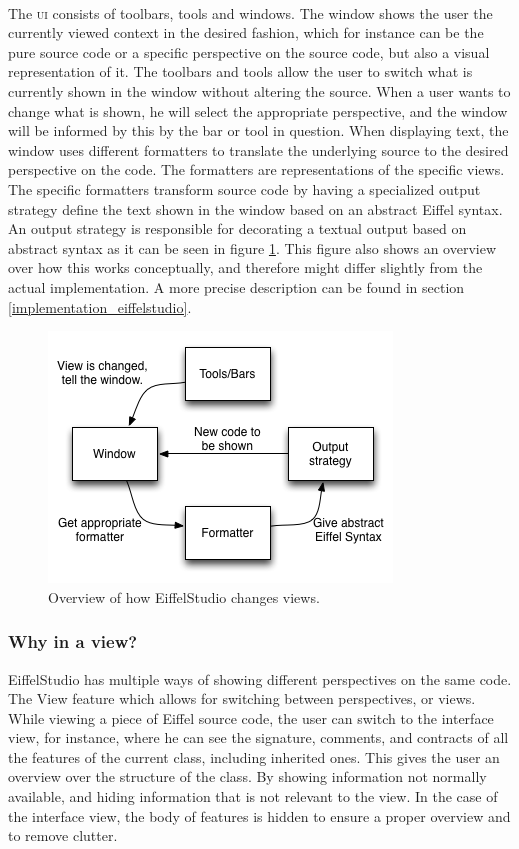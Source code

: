 \paragraph{}
The \textsc{ui} consists of toolbars, tools and windows. The window shows the user the currently viewed context in the desired fashion, which for instance can be the pure source code or a specific perspective on the source code, but also a visual representation of it. The toolbars and tools allow the user to switch what is currently shown in the window without altering the source. When a user wants to change what is shown, he will select the appropriate perspective, and the window will be informed by this by the bar or tool in question. When displaying text, the window uses different formatters to translate the underlying source to the desired perspective on the code. The formatters are representations of the specific views. The specific formatters transform source code by having a specialized output strategy define the text shown in the window based on an abstract Eiffel syntax. An output strategy is responsible for decorating a textual output based on abstract syntax as it can be seen in figure \ref{fig:eiffelstudio_view_change}. This figure also shows an overview over how this works conceptually, and therefore might differ slightly from the actual implementation. A more precise description can be found in section \ref{implementation_eiffelstudio}.

\begin{figure}[H]
\centerline{
\includegraphics[scale=0.7]{images/eiffel_view_text_design.png}
}
\caption[EiffelStudio view control]{Overview of how EiffelStudio changes views.}
\label{fig:eiffelstudio_view_change}
\end{figure}

\subsubsection{Why in a view?}
\label{why_a_view}
EiffelStudio has multiple ways of showing different perspectives on the same code. The View feature which allows for switching between perspectives, or views. While viewing a piece of Eiffel source code, the user can switch to the interface view, for instance, where he can see the signature, comments, and contracts of all the features  of the current class, including inherited ones. This gives the user an overview over the structure of the class. By showing information not normally available, and hiding information that is not relevant to the view. In the case of the interface view, the body of features is hidden to ensure a proper overview and to remove clutter.
